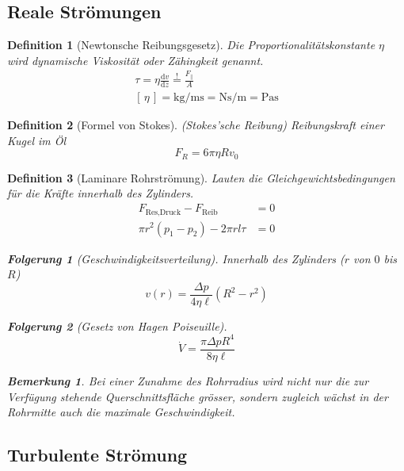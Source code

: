 \documentclass[a4paper, twocolumn]{article}
\numberwithin{equation}{section}
\theoremstyle{hsr-def}
\newtheorem{definition}{Definition}[section]
\theoremstyle{hsr-sub}
\newtheorem{result}{Folgerung}[definition]
\theoremstyle{hsr-unnum}
\newtheorem{remark}{Bemerkung}[definition]
\newcommand{\dd}[1]{\ensuremath{\mathrm{d}#1}}
\newcommand{\deriv}[2]{\ensuremath{\frac{\dd{#1}}{\dd{#2}}}}
\newcommand{\unitsof}[1]{\ensuremath{\left[\,#1\,\right]}}
\begin{document}
\subsection{Reale Str\"omungen}

\begin{definition}[Newtonsche Reibungsgesetz]
Die Proportionalit\"atskonstante \(\eta\) wird \emph{dynamische Viskosit\"at} oder \emph{Z\"ahingkeit} genannt.
\begin{gather*}
    \tau = \eta \deriv{v}{z}
    \stackrel{!}{=} \frac{F_\parallel}{A}  \\
    \unitsof{\eta}  
    = \si{\kilo\gram\per\metre\second}
    = \si{\newton\second\per\metre}
    = \si{\pascal\second}
\end{gather*}
\end{definition}

\begin{definition}[Formel von Stokes]
(Stokes'sche Reibung) Reibungskraft einer Kugel im \"Ol 
\[
    F_R = 6\pi\eta Rv_0
\]
\end{definition}

\begin{definition}[Laminare Rohrstr\"omung]
Lauten die Gleichgewichtsbedingungen f\"ur die Kr\"afte innerhalb des Zylinders.
\begin{align*}
    F_\text{Res,Druck} - F_\text{Reib} & = 0 \\
    \pi r^2 (p_1 - p_2) - 2\pi rl\tau &= 0
\end{align*}

\begin{result}[Geschwindigkeitsverteilung] 
Innerhalb des Zylinders (\(r\) von \(0\) bis \(R\))
\[
    v(r) = \frac{\Delta p}{4\eta\ell}\left(R^2-r^2\right)
\]
\end{result}

\begin{result}[Gesetz von Hagen Poiseuille]
\[
    \dot{V} = \frac{\pi\Delta p R^4}{8\eta\ell}
\]
\end{result}

\begin{remark}
Bei einer Zunahme des Rohrradius wird nicht nur die zur Verf\"ugung stehende Querschnittsfl\"ache gr\"osser, sondern zugleich w\"achst in der Rohrmitte auch die maximale Geschwindigkeit.
\end{remark}
\end{definition}

\subsection{Turbulente Str\"omung}
\end{document}

